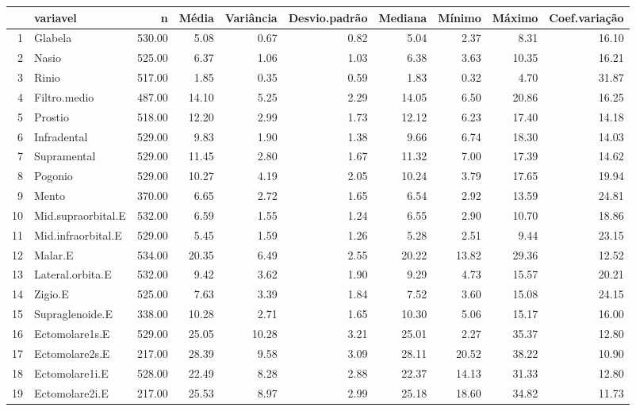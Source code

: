 \begin{table}[ht]
\centering
\begin{tabular}{rlrrrrrrrr}
  \hline
 & variavel & n & Média & Variância & Desvio.padrão & Mediana & Mínimo & Máximo & Coef.variação \\ 
  \hline
1 & Glabela & 530.00 & 5.08 & 0.67 & 0.82 & 5.04 & 2.37 & 8.31 & 16.10 \\ 
  2 & Nasio & 525.00 & 6.37 & 1.06 & 1.03 & 6.38 & 3.63 & 10.35 & 16.21 \\ 
  3 & Rinio & 517.00 & 1.85 & 0.35 & 0.59 & 1.83 & 0.32 & 4.70 & 31.87 \\ 
  4 & Filtro.medio & 487.00 & 14.10 & 5.25 & 2.29 & 14.05 & 6.50 & 20.86 & 16.25 \\ 
  5 & Prostio & 518.00 & 12.20 & 2.99 & 1.73 & 12.12 & 6.23 & 17.40 & 14.18 \\ 
  6 & Infradental & 529.00 & 9.83 & 1.90 & 1.38 & 9.66 & 6.74 & 18.30 & 14.03 \\ 
  7 & Supramental & 529.00 & 11.45 & 2.80 & 1.67 & 11.32 & 7.00 & 17.39 & 14.62 \\ 
  8 & Pogonio & 529.00 & 10.27 & 4.19 & 2.05 & 10.24 & 3.79 & 17.65 & 19.94 \\ 
  9 & Mento & 370.00 & 6.65 & 2.72 & 1.65 & 6.54 & 2.92 & 13.59 & 24.81 \\ 
  10 & Mid.supraorbital.E & 532.00 & 6.59 & 1.55 & 1.24 & 6.55 & 2.90 & 10.70 & 18.86 \\ 
  11 & Mid.infraorbital.E & 529.00 & 5.45 & 1.59 & 1.26 & 5.28 & 2.51 & 9.44 & 23.15 \\ 
  12 & Malar.E & 534.00 & 20.35 & 6.49 & 2.55 & 20.22 & 13.82 & 29.36 & 12.52 \\ 
  13 & Lateral.orbita.E & 532.00 & 9.42 & 3.62 & 1.90 & 9.29 & 4.73 & 15.57 & 20.21 \\ 
  14 & Zigio.E & 525.00 & 7.63 & 3.39 & 1.84 & 7.52 & 3.60 & 15.08 & 24.15 \\ 
  15 & Supraglenoide.E & 338.00 & 10.28 & 2.71 & 1.65 & 10.30 & 5.06 & 15.17 & 16.00 \\ 
  16 & Ectomolare1s.E & 529.00 & 25.05 & 10.28 & 3.21 & 25.01 & 2.27 & 35.37 & 12.80 \\ 
  17 & Ectomolare2s.E & 217.00 & 28.39 & 9.58 & 3.09 & 28.11 & 20.52 & 38.22 & 10.90 \\ 
  18 & Ectomolare1i.E & 528.00 & 22.49 & 8.28 & 2.88 & 22.37 & 14.13 & 31.33 & 12.80 \\ 
  19 & Ectomolare2i.E & 217.00 & 25.53 & 8.97 & 2.99 & 25.18 & 18.60 & 34.82 & 11.73 \\ 

\end{tabular}
\end{table}
